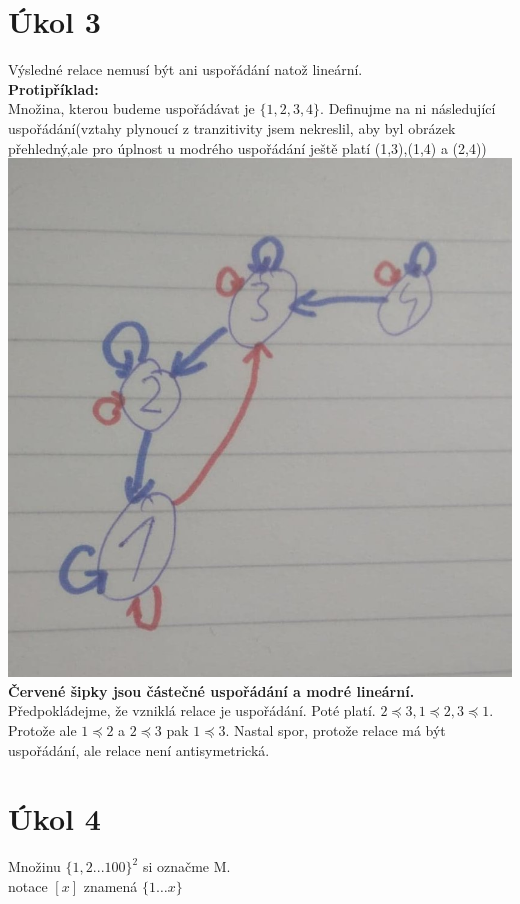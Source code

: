 \documentclass{article}
\begin{document}
\section{Úkol 3}
Výsledné relace nemusí být ani uspořádání natož lineární.\\
\textbf{Protipříklad:}\\
Množina, kterou budeme uspořádávat je $\{1,2,3,4\}$. Definujme na ni následující uspořádání(vztahy plynoucí z tranzitivity jsem nekreslil, aby byl obrázek přehledný,ale pro úplnost u modrého uspořádání ještě platí (1,3),(1,4) a (2,4))\\
\includegraphics[scale=0.2]{3.jpg}\\
\textbf{Červené šipky jsou částečné uspořádání a modré lineární.}\\
Předpokládejme, že vzniklá relace je uspořádání. Poté platí. $2 \preceq 3, 1 \preceq 2, 3 \preceq 1$. Protože ale $1 \preceq 2$ a $2 \preceq 3$ pak $1 \preceq 3$. Nastal spor, protože relace má být uspořádání, ale relace není antisymetrická.

\section{Úkol 4}
Množinu $\{1,2...100\}^2$ si označme M.\\
notace $[x]$ znamená $\{1\dots{x}\}$
\end{document}
